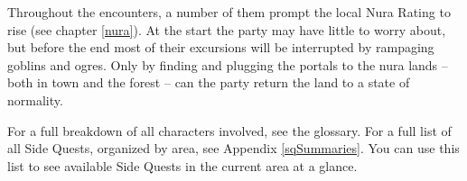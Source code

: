 \begin{multicols}{2}
\begin{exampletext}
\end{exampletext}

Throughout the encounters, a number of them prompt the local Nura Rating to rise (see chapter \ref{nura}).
At the start the party may have little to worry about, but before the end most of their excursions will be interrupted by rampaging goblins and ogres.
Only by finding and plugging the portals to the nura lands -- both in town and the forest -- can the party return the land to a state of normality.

For a full breakdown of all characters involved, see the glossary.
For a full list of all Side Quests, organized by area, see Appendix \ref{sqSummaries}.
You can use this list to see available Side Quests in the current area at a glance.

\end{multicols}

